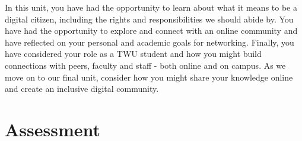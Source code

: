 \documentclass[
]{book}
\theoremstyle{definition}
\theoremstyle{definition}
\theoremstyle{definition}
\theoremstyle{definition}
\theoremstyle{remark}
\begin{document}
In this unit, you have had the opportunity to learn about what it means to be a digital citizen, including the rights and responsibilities we should abide by. You have had the opportunity to explore and connect with an online community and have reflected on your personal and academic goals for networking. Finally, you have considered your role as a TWU student and how you might build connections with peers, faculty and staff - both online and on campus. As we move on to our final unit, consider how you might share your knowledge online and create an inclusive digital community.

\hypertarget{assessment-4}{%
\section*{Assessment}\label{assessment-4}}
\end{document}
